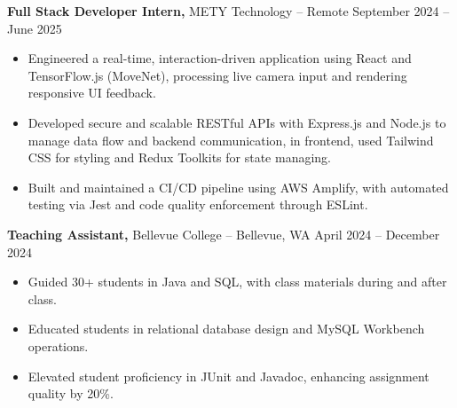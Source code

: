 \documentclass[11pt]{article}       %
\begin{document}
\textbf{Full Stack Developer Intern,} {METY Technology} -- Remote \hfill September 2024 -- June 2025 
\vspace{-9pt}
\begin{itemize}
  \item Engineered a real-time, interaction-driven application using React and TensorFlow.js (MoveNet), processing live camera input and rendering responsive UI feedback.
  \item Developed secure and scalable RESTful APIs with Express.js and Node.js to manage data flow and backend communication, in frontend, used Tailwind CSS for styling and Redux Toolkits for state managing.
  \item Built and maintained a CI/CD pipeline using AWS Amplify, with automated testing via Jest and code quality enforcement through ESLint.
\end{itemize}

\textbf{Teaching Assistant,} {Bellevue College} -- Bellevue, WA \hfill April 2024 -- December 2024 \\
\vspace{-9pt}
\begin{itemize}
  \item Guided 30+ students in Java and SQL, with class materials during and after class.
  \item Educated students in relational database design and MySQL Workbench operations.
  \item Elevated student proficiency in JUnit and Javadoc, enhancing assignment quality by 20\%.
\end{itemize}
\end{document}
